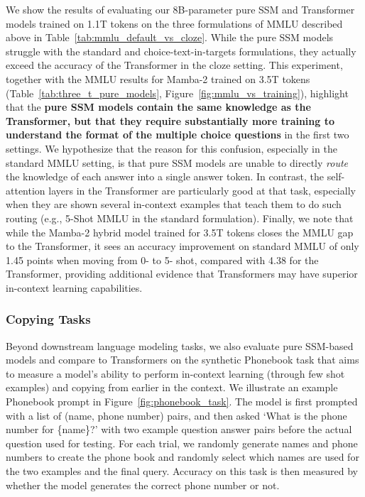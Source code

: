 We show the results of evaluating our 8B-parameter pure SSM and Transformer models trained on 1.1T tokens on the three formulations of MMLU described above in Table~\ref{tab:mmlu_default_vs_cloze}. While the pure SSM models struggle with the standard and choice-text-in-targets formulations, they actually exceed the accuracy of the Transformer in the cloze setting. This experiment, together with the MMLU results for Mamba-2 trained on 3.5T tokens (Table~\ref{tab:three_t_pure_models}, Figure~\ref{fig:mmlu_vs_training}), highlight that the \textbf{pure SSM models contain the same knowledge as the Transformer, but that they require substantially more training to understand the format of the multiple choice questions} in the first two settings. We hypothesize that the reason for this confusion, especially in the standard MMLU setting, is that pure SSM models are unable to directly \textit{route} the knowledge of each answer into a single answer token. In contrast, the self-attention layers in the Transformer are particularly good at that task, especially when they are shown several in-context examples that teach them to do such routing (e.g., 5-Shot MMLU in the standard formulation). Finally, we note that while the Mamba-2 hybrid model trained for 3.5T tokens closes the MMLU gap to the Transformer, it sees an accuracy improvement on standard MMLU of only 1.45 points when moving from 0- to 5- shot, compared with 4.38 for the Transformer, providing additional evidence that Transformers may have superior in-context learning capabilities.

\subsubsection{Copying Tasks}
\label{subsec:pure_model_copying}

Beyond downstream language modeling tasks, we also evaluate pure SSM-based models and compare to Transformers on the synthetic Phonebook task \citep{jelassi2024repeatafterme} that aims to measure a model's ability to perform in-context learning (through few shot examples) and copying from earlier in the context. We illustrate an example Phonebook prompt in Figure~\ref{fig:phonebook_task}. The model is first prompted with a list of (name, phone number) pairs, and then asked `What is the phone number for \{name\}?' with two example question answer pairs before the actual question used for testing. For each trial, we randomly generate names and phone numbers to create the phone book and randomly select which names are used for the two examples and the final query. Accuracy on this task is then measured by whether the model generates the correct phone number or not.

